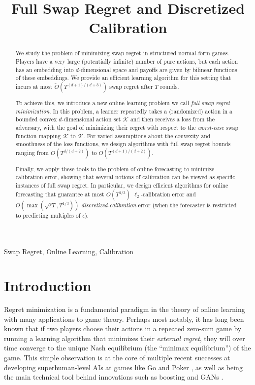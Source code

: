 \documentclass[final,12pt]{alt2025}
\title[Full Swap Regret and Discretized Calibration]{Full Swap Regret and Discretized Calibration}
\begin{document}
\maketitle

\begin{abstract}
We study the problem of minimizing swap regret in structured normal-form games. Players have a very large (potentially infinite) number of pure actions, but each action has an embedding into $d$-dimensional space and payoffs are given by bilinear functions of these embeddings. We provide an efficient learning algorithm for this setting that incurs at most $\tilde{O}(T^{(d+1)/(d+3)})$ swap regret after $T$ rounds.

To achieve this, we introduce a new online learning problem we call \emph{full swap regret minimization}. In this problem, a learner repeatedly takes a (randomized) action in a bounded convex $d$-dimensional action set $\mathcal{K}$ and then receives a loss from the adversary, with the goal of minimizing their regret with respect to the \emph{worst-case} swap function mapping $\mathcal{K}$ to $\mathcal{K}$. For varied assumptions about the convexity and smoothness of the loss functions, we design algorithms with full swap regret bounds ranging from $O(T^{d/(d+2)})$ to $O(T^{(d+1)/(d+2)})$.

Finally, we apply these tools to the problem of online forecasting to minimize calibration error, showing that several notions of calibration can be viewed as specific instances of full swap regret. In particular, we design efficient algorithms for online forecasting that guarantee at most $O(T^{1/3})$ $\ell_2$-calibration error and $O(\max(\sqrt{\epsilon T}, T^{1/3}))$ \emph{discretized-calibration} error (when the forecaster is restricted to predicting multiples of $\epsilon$).
\end{abstract}

\begin{keywords}
  Swap Regret, Online Learning, Calibration
\end{keywords}







\section{Introduction}

Regret minimization is a fundamental paradigm in the theory of online learning with many applications to game theory. Perhaps most notably, it has long been known that if two players choose their actions in a repeated zero-sum game by running a learning algorithm that minimizes their \emph{external regret}, they will over time converge to the unique Nash equilibrium (the ``minimax equilibrium'') of the game. This simple observation is at the core of multiple recent successes at developing superhuman-level AIs at games like Go and Poker \citep{silver2017mastering, brown2018superhuman}, as well as being the main technical tool behind innovations such as boosting and GANs \citep{goodfellow2020generative, freund1996game}. 
\end{document}
